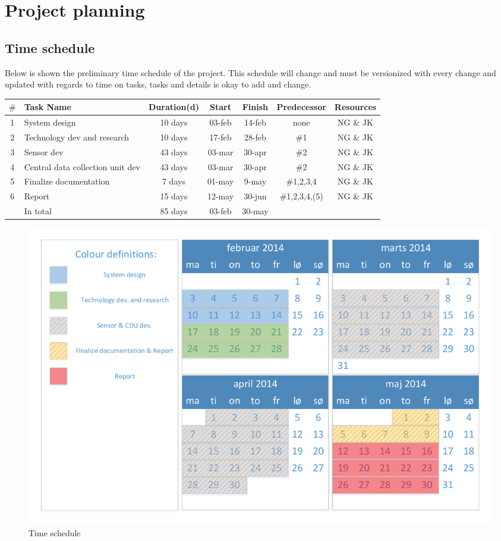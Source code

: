 \chapter{Project planning}
\section{Time schedule}
Below is shown the preliminary time schedule of the project. This schedule will change and must be versionized with every change and updated with regards to time on tasks, tasks and details is okay to add and change.\\ 

\begin{table}[H]
\centering
\begin{tabular}{|c |p{4cm} |c |c |c |c |c|}
\hline 
$\#$ & Task Name & Duration(d) & Start & Finish & Predecessor & Resources \\ 
\hline 
1 & System design & 10 days & 03-feb & 14-feb & none & NG \& JK \\ 
\hline 
2 & Technology dev and research & 10 days & 17-feb & 28-feb & $\#$1 & NG \& JK \\ 
\hline 
3 & Sensor dev & 43 days & 03-mar & 30-apr & $\#$2 & NG \& JK \\ 
\hline 
4 & Central data collection unit dev & 43 days & 03-mar & 30-apr & $\#$2 & NG \& JK \\ 
\hline 
5 & Finalize documentation & 7 days & 01-may & 9-may & $\#$1,2,3,4 & NG \& JK \\ 
\hline 
6 & Report & 15 days & 12-may & 30-jun & $\#$1,2,3,4,(5) & NG \& JK \\ 
\hline \hline
~ & In total & 85 days & 03-feb & 30-may & ~ & ~ \\ 
\hline 
\end{tabular} 
\end{table}

\begin{figure}[H]
\centering
\includegraphics[width=.9\textwidth]{billeder/timeschedule_vector}
\caption{Time schedule}
\end{figure}

